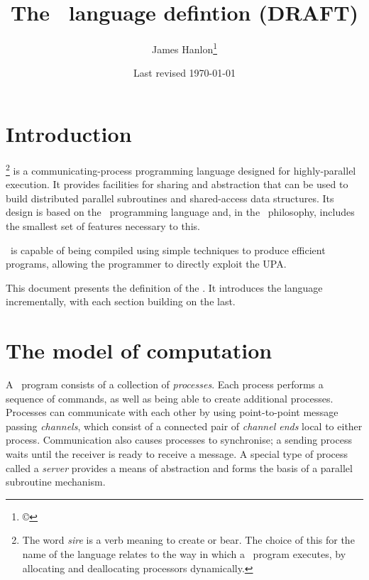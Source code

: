 \documentclass[11pt,a4paper,parskip=half-]{scrartcl}
\title{The \sire\ language defintion (DRAFT)}
\author{James Hanlon\footnote{\copyright}}
\date{Last revised \today}
\begin{document}
\maketitle

\setcounter{tocdepth}{2}
\tableofcontents

\clearpage\section{Introduction}

\def\sirewordfootnote{The word \emph{sire} is a verb meaning to create or bear.
The choice of this for the name of the language relates to the way in which a
\sire\ program executes, by allocating and deallocating processors dynamically.}

\emph{\Sire}\footnote{\sirewordfootnote} is a communicating-process programming
language designed for highly-parallel execution.
%
It provides facilities for sharing and abstraction that can be used to
build distributed parallel subroutines and shared-access data structures.
%
Its design is based on the \occam\ programming language and, in the \occam\
philosophy, includes the smallest set of features necessary to this.

\Sire\ is capable of being compiled using simple techniques to produce
efficient programs, allowing the programmer to directly exploit the UPA.

This document presents the definition of the \sire. It introduces the
language incrementally, with each section building on the last.
 

\section{The model of computation}

A \sire\ program consists of a collection of \emph{processes}. Each process
performs a sequence of commands, as well as being able to create additional
processes.
%
Processes can communicate with each other by using point-to-point message
passing \emph{channels}, which consist of a connected pair of \emph{channel
ends} local to either process. Communication also causes processes
to synchronise; a sending process waits until the receiver is ready to receive
a message.
%
A special type of process called a \emph{server} provides a means of
abstraction and forms the basis of a parallel subroutine mechanism.
\end{document}
